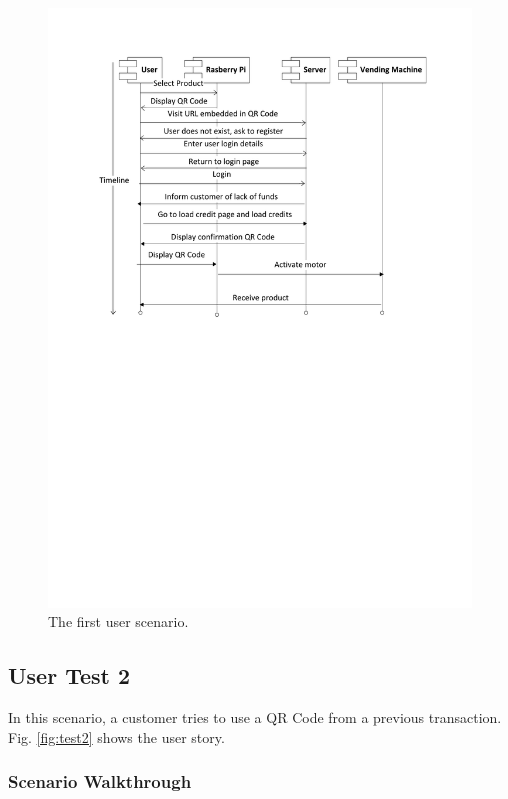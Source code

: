 \begin{figure}
 \centering 
 \includegraphics[clip=true, trim = 0 410 0 60,
 scale=0.7]{user_story_1}
 \caption{The first user scenario.}
 \label{fig:test1}
\end{figure}

\subsection{User Test 2}

In this scenario, a customer tries to use a QR Code from a previous transaction. Fig.
\ref{fig:test2} shows the user story.

\subsubsection{Scenario Walkthrough}

